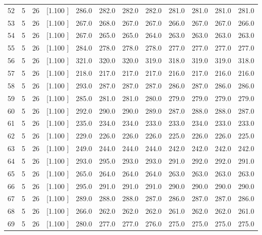 \documentclass[12pt,a4paper]{article}
\begin{document}
\begin{center}
{\begin{tabular}{r r r r r r r r r r r r}
  52&  5& 26&[1.100     ]&   286.0&   282.0&   282.0&   282.0&   281.0&   281.0&   281.0&   281.0\\[-0.02in]
  53&  5& 26&[1.100     ]&   267.0&   268.0&   267.0&   267.0&   266.0&   267.0&   267.0&   266.0\\[-0.02in]
  54&  5& 26&[1.100     ]&   267.0&   265.0&   265.0&   264.0&   263.0&   263.0&   263.0&   263.0\\[-0.02in]
  55&  5& 26&[1.100     ]&   284.0&   278.0&   278.0&   278.0&   277.0&   277.0&   277.0&   277.0\\[-0.02in]
  56&  5& 26&[1.100     ]&   321.0&   320.0&   320.0&   319.0&   318.0&   319.0&   319.0&   318.0\\[-0.02in]
  57&  5& 26&[1.100     ]&   218.0&   217.0&   217.0&   217.0&   216.0&   217.0&   216.0&   216.0\\[-0.02in]
  58&  5& 26&[1.100     ]&   293.0&   287.0&   287.0&   287.0&   286.0&   287.0&   286.0&   286.0\\[-0.02in]
  59&  5& 26&[1.100     ]&   285.0&   281.0&   281.0&   280.0&   279.0&   279.0&   279.0&   279.0\\[-0.02in]
  60&  5& 26&[1.100     ]&   292.0&   290.0&   290.0&   289.0&   287.0&   288.0&   288.0&   287.0\\[-0.02in]
  61&  5& 26&[1.100     ]&   235.0&   234.0&   234.0&   233.0&   233.0&   234.0&   233.0&   233.0\\[-0.02in]
  62&  5& 26&[1.100     ]&   229.0&   226.0&   226.0&   226.0&   225.0&   226.0&   226.0&   225.0\\[-0.02in]
  63&  5& 26&[1.100     ]&   249.0&   244.0&   244.0&   244.0&   242.0&   242.0&   242.0&   242.0\\[-0.02in]
  64&  5& 26&[1.100     ]&   293.0&   295.0&   293.0&   293.0&   291.0&   292.0&   292.0&   291.0\\[-0.02in]
  65&  5& 26&[1.100     ]&   265.0&   264.0&   264.0&   264.0&   263.0&   263.0&   263.0&   263.0\\[-0.02in]
  66&  5& 26&[1.100     ]&   295.0&   291.0&   291.0&   291.0&   290.0&   290.0&   290.0&   290.0\\[-0.02in]
  67&  5& 26&[1.100     ]&   289.0&   288.0&   288.0&   287.0&   286.0&   287.0&   287.0&   286.0\\[-0.02in]
  68&  5& 26&[1.100     ]&   266.0&   262.0&   262.0&   262.0&   261.0&   262.0&   262.0&   261.0\\[-0.02in]
  69&  5& 26&[1.100     ]&   280.0&   277.0&   277.0&   276.0&   275.0&   275.0&   275.0&   275.0\\[-0.02in]

\end{tabular}}
\end{center}
\end{document}
